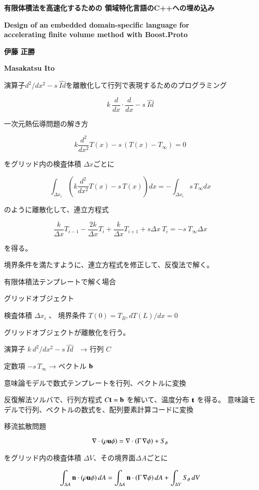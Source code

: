 \documentclass[a4j,11pt]{jarticle}
\begin{document}
\renewcommand{\baselinestretch}{1.12}\small\normalsize
\begin{center}
  \textbf{\Large 有限体積法を高速化するための 領域特化言語のC++への埋め込み}
  
  \textbf{\large Design of an embedded domain-specific language for\\ 
accelerating finite volume method with Boost.Proto}
\end{center}
\begin{center}  
  \textbf{伊藤 正勝}

  \textbf{Masakatsu Ito}

\end{center}

演算子\(  d^2 / dx^2 - s\ \hat{Id} \)を離散化して行列で表現するためのプログラミング

\[ k \ \frac{d}{dx} \cdot  \frac{d}{dx} - s\ \hat{Id}  \]


一次元熱伝導問題の解き方

\[ k \frac{d^2}{dx^2} T(x) - s \, ( T(x) - T_\infty ) = 0    \]

をグリッド内の検査体積 \(\Delta x\)ごとに

\[ \int_{\Delta x_i} \left(  k \frac{d^2}{dx^2} T(x) - s \, T(x)   \right) dx =  - \int_{\Delta x_i} s \, T_\infty dx  \]

のように離散化して、連立方程式

\[ \frac{k}{\Delta x} T_{i-1} - \frac{2 k}{\Delta x}T_i +  \frac{k}{\Delta x} T_{i+1} + s  \Delta x\ T_i =  - s\ T_\infty \Delta x   \]

を得る。


境界条件を満たすように、連立方程式を修正して、反復法で解く。

 

有限体積法テンプレートで解く場合

    グリッドオブジェクト

        検査体積 \( \Delta x_i\) 、 境界条件 \( T(0) = T_B , d T(L) / dx = 0 \)

    グリッドオブジェクトが離散化を行う。

        演算子 \(  k\ d^2 / dx^2 - s\ \hat{Id} \)　→ 行列 \(C\)

        定数項 \( - s \, T_\infty \) → ベクトル \( \bf b \)

            意味論モデルで数式テンプレートを行列、ベクトルに変換

    反復解法ソルバで、行列方程式 \( C {\bf t} = {\bf b} \) を解いて、温度分布 \( \bf t\) を得る。
        意味論モデルで行列、ベクトルの数式を、配列要素計算コードに変換

 


移流拡散問題

\[ {\bf \nabla} \cdot ( \rho {\bf u} \phi) = {\bf \nabla} \cdot ( \Gamma \, {\bf \nabla} \phi )  + S_\phi \]

をグリッド内の検査体積 \(\Delta V\)、その境界面\(\Delta A\)ごとに

\[ \int_{\Delta A} {\bf n} \cdot ( \rho {\bf u} \phi )\, dA = \int_{\Delta A} {\bf n} \cdot ( \Gamma \,  {\bf \nabla} \phi )\, dA + \int_{\Delta V} S_\phi \,dV  \]
 
\end{document}
